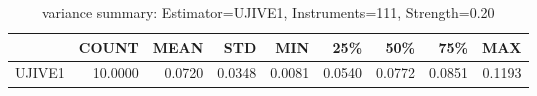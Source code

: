 \begin{table}[ht]
\centering
\caption{variance summary: Estimator=UJIVE1, Instruments=111, Strength=0.20}
\begin{tabular}{lrrrrrrrr}
\toprule
 & COUNT & MEAN & STD & MIN & 25\% & 50\% & 75\% & MAX \\
\midrule
UJIVE1 & 10.0000 & 0.0720 & 0.0348 & 0.0081 & 0.0540 & 0.0772 & 0.0851 & 0.1193 \\
\bottomrule
\end{tabular}
\end{table}
